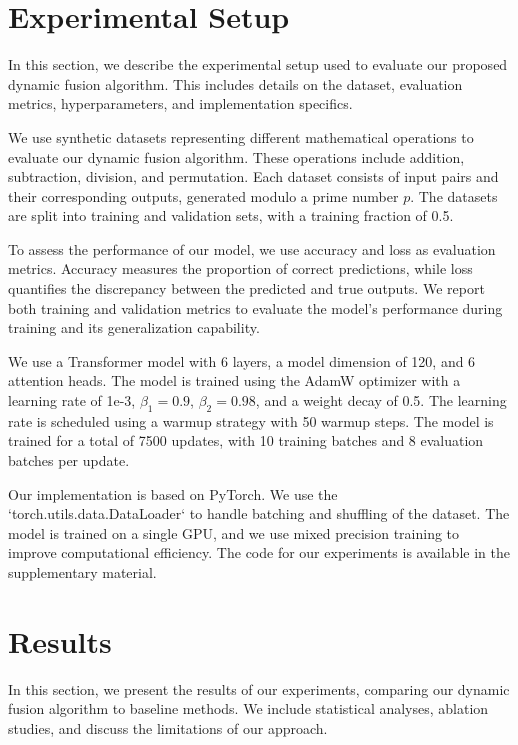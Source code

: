 \documentclass{article} %
\begin{document}
\section{Experimental Setup}
\label{sec:experimental}

In this section, we describe the experimental setup used to evaluate our proposed dynamic fusion algorithm. This includes details on the dataset, evaluation metrics, hyperparameters, and implementation specifics.

We use synthetic datasets representing different mathematical operations to evaluate our dynamic fusion algorithm. These operations include addition, subtraction, division, and permutation. Each dataset consists of input pairs and their corresponding outputs, generated modulo a prime number $p$. The datasets are split into training and validation sets, with a training fraction of 0.5.

To assess the performance of our model, we use accuracy and loss as evaluation metrics. Accuracy measures the proportion of correct predictions, while loss quantifies the discrepancy between the predicted and true outputs. We report both training and validation metrics to evaluate the model's performance during training and its generalization capability.

We use a Transformer model with 6 layers, a model dimension of 120, and 6 attention heads. The model is trained using the AdamW optimizer with a learning rate of 1e-3, $\beta_1=0.9$, $\beta_2=0.98$, and a weight decay of 0.5. The learning rate is scheduled using a warmup strategy with 50 warmup steps. The model is trained for a total of 7500 updates, with 10 training batches and 8 evaluation batches per update.

Our implementation is based on PyTorch. We use the `torch.utils.data.DataLoader` to handle batching and shuffling of the dataset. The model is trained on a single GPU, and we use mixed precision training to improve computational efficiency. The code for our experiments is available in the supplementary material.

\section{Results}
\label{sec:results}

In this section, we present the results of our experiments, comparing our dynamic fusion algorithm to baseline methods. We include statistical analyses, ablation studies, and discuss the limitations of our approach.
\end{document}
